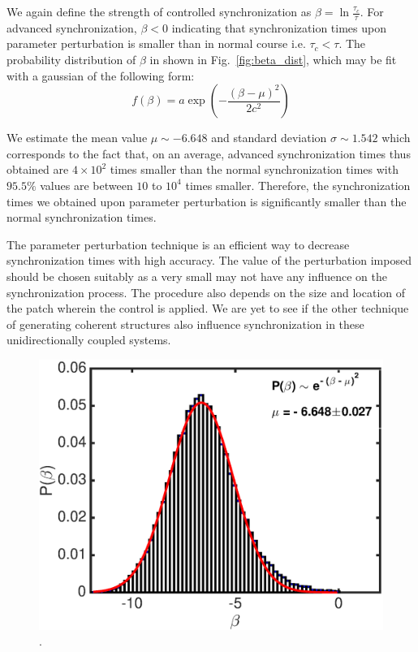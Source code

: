 \documentclass[preprint,showpacs,preprintnumbers,amsmath,amssymb]{revtex4-1}
\begin{document}
We again define the strength of controlled synchronization as $\beta = \ln \frac{\tau_c}{\tau}$. For advanced synchronization, $\beta < 0$ indicating that synchronization times upon parameter perturbation is smaller than in normal course i.e. $\tau_c < \tau$. The probability distribution of $\beta$ in shown in Fig.~\ref{fig:beta_dist}, which may be fit with a gaussian of the following form:
\begin{equation}
f(\beta) =  a\exp(-\frac{(\beta-\mu)^2}{2c^2})
\end{equation}

We estimate the mean value $\mu \sim - 6.648$ and standard deviation $\sigma \sim1.542$ which corresponds to the fact that, on an average, advanced synchronization times thus obtained are $4\times10^2$ times smaller than the normal synchronization times with $95.5\%$ values are between $10$ to $10^4$ times smaller.  Therefore, the synchronization times we obtained upon parameter perturbation is significantly smaller than the normal synchronization times.  

The parameter perturbation technique is an efficient way to decrease synchronization times with high accuracy.  The value of the perturbation imposed should be chosen suitably as a very small may not have any influence on the synchronization process. The procedure also depends on the size and location of the patch wherein the control is applied. We are yet to see if the other technique of generating coherent structures also influence synchronization in these unidirectionally coupled systems. 


 \begin{figure}[h]
\includegraphics[scale=0.6]{Fast_strength_dist.eps}
\caption{\label{fig:location} \footnotesize.}
\end{figure}
 
\end{document}

